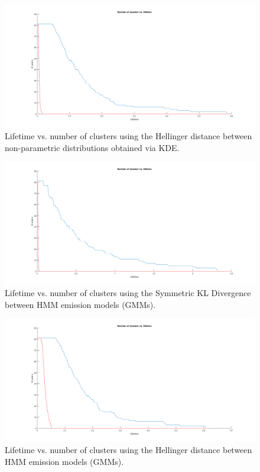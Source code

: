 \documentclass[pdftex,11pt,a4paper]{article}
\theoremstyle{definition}
\theoremstyle{remark}
\begin{document}
\begin{figure}[H]
\centering
\includegraphics[width=\textwidth]{images/lifetime_kde_hellinger}
\caption{Lifetime vs. number of clusters using the Hellinger distance between non-parametric distributions obtained via KDE.}
\label{fig_lt_kde_hellinger}
\end{figure}

\begin{figure}[H]
\centering
\includegraphics[width=\textwidth]{images/lifetime_gmm_skld}
\caption{Lifetime vs. number of clusters using the Symmetric KL Divergence between HMM emission models (GMMs).}
\label{fig_lt_gmm_skld}
\end{figure}

\begin{figure}[H]
\centering
\includegraphics[width=\textwidth]{images/lifetime_gmm_hellinger}
\caption{Lifetime vs. number of clusters using the Hellinger distance between HMM emission models (GMMs).}
\label{fig_lt_gmm_hellinger}
\end{figure}
\end{document}
